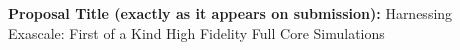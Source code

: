 \documentclass[9pt,landscape]{article}
\begin{document}
\setlength{\parindent}{0in} %

\pagestyle{fancy}   \renewcommand{%
\headrulewidth}{0.0pt}

\textbf{Proposal Title (exactly as it appears on submission):} Harnessing Exascale: First of a Kind High Fidelity Full Core Simulations

%
%
%
%
\vspace{-.5cm}
\end{document}
